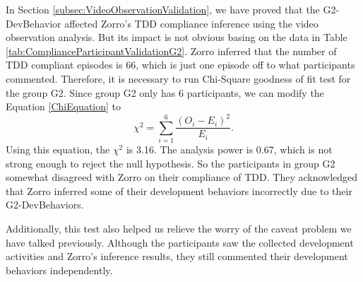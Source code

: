 In Section \ref{subsec:VideoObservationValidation}, we have proved that
the G2-DevBehavior affected Zorro's TDD compliance inference using the
video observation analysis. But its impact is not obvious basing on
the data in Table \ref{tab:ComplianceParticipantValidationG2}. Zorro 
inferred that the number of TDD compliant episodes is 66, which is just
one episode off to what participants commented. Therefore, it is necessary
to run Chi-Square goodness of fit test for the group G2. 
Since group G2 only has 6 participants, we can modify the Equation
\ref{ChiEquation} to 
\[
   \chi^2 = \sum_{i=1}^{6}\frac{(O_{i}-E_{i})^2}{E_{i}}.
\]
Using this equation, the \begin{math}\chi^2\end{math} is 3.16. The 
analysis power is 0.67, which is not strong enough to reject the null
hypothesis. So the participants in group G2 somewhat disagreed with
Zorro on their compliance of TDD. They acknowledged that Zorro inferred
some of their development behaviors incorrectly due to their 
G2-DevBehaviors. 

Additionally, this test also helped us relieve the worry of the caveat
problem we have talked previously. Although the participants saw the 
collected development activities and Zorro's inference results, they
still commented their development behaviors independently.

